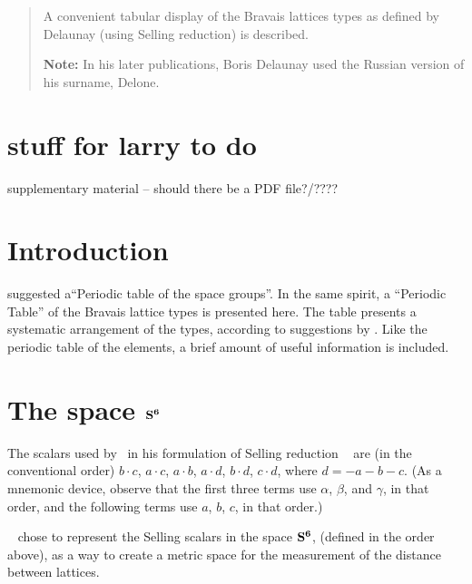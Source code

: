 \documentclass[preprint]{iucr}              %
\numberwithin{equation}{section}
\newcommand{\SVI}[0]{$\bf{S^{6}}$}
\begin{document}
	\newcommand{\ci}[0]{$c_1$}
	\newcommand{\cii}[0]{$c_2$}
	\newcommand{\ciii}[0]{$c_3$}
	
	
	\begin{abstract}
		
		A convenient tabular display of the Bravais lattices types
		as defined by Delaunay (using Selling reduction) is described.

		
		{\bf Note:}  In his later publications, Boris Delaunay used the Russian version of his surname, Delone.\\
		
		
	\end{abstract}
	
	\section{stuff for larry to do}
	supplementary material -- should there be a PDF file?/????
	
	
	\section{Introduction}
	 suggested a``Periodic table of the space groups''. In the
	same spirit, a ``Periodic Table'' of the Bravais lattice types is presented here.
	The table presents a systematic arrangement of the types, according to suggestions
	by . Like the periodic table of the elements, a brief amount
	of useful information is included.
	
        \section{The space \SVI{}}
	
		The scalars used by~ in his formulation of Selling reduction ~\cite{Selling1874}
	are (in the conventional order) $b \cdot c$, $a \cdot c$, $a \cdot b$, $a \cdot d$, 
	$b \cdot d$, $c \cdot d$, where $d = -a-b-c$. 
	(As a mnemonic device, 
	observe that the first three terms use
	$\alpha$, $\beta$, and $\gamma$, 
	in that order, 
	and the following terms use $a$, $b$, $c$, in that order.)
	
	~ chose to 
	represent the Selling scalars in the space \SVI{},
	\Svec{} (defined in the order above), 
	as a way to create a metric space
	for the measurement of the distance between lattices. 
\end{document}
